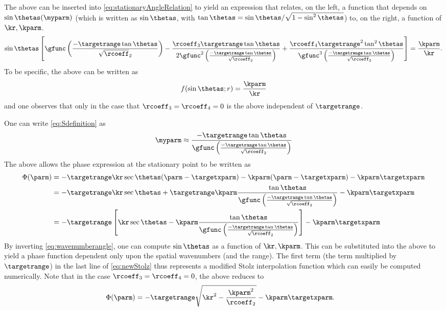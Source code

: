 The above can be inserted into \eqref{eq:stationaryAngleRelation} to yield an expression that relates, on the left, a function that depends on $\sin\thetas(\myparm)$ (which is written as $\sin\thetas$, with $\tan\thetas=\sin\thetas/\sqrt{1-\sin^2\thetas}$) to, on the right, a function of $\kr, \kparm$.
\begin{equation}
 \sin\thetas\left[\gfunc\left(\frac{-\targetrange\tan\thetas}{\sqrt\rcoeff_2}\right) - \frac{\rcoeff_3\targetrange\tan\thetas}{2\gfunc^2\left(\frac{-\targetrange\tan\thetas}{\sqrt\rcoeff_2}\right)} + \frac{\rcoeff_4\targetrange^2\tan^2\thetas}{\gfunc^3\left(\frac{-\targetrange\tan\thetas}{\sqrt\rcoeff_2}\right)}\right] = \frac{\kparm}{\kr}.
 \label{eq:angleRelation}
\end{equation}
To be specific, the above can be written as
\begin{equation}
 f(\sin\thetas; r) = \frac{\kparm}{\kr}
 \label{eq:wavenumberangle}
\end{equation}
and one observes that only in the case that $\rcoeff_3=\rcoeff_4=0$ is the above independent of $\targetrange$.
\par
One can write \eqref{eq:Sdefinition} as
\begin{equation}
 \myparm\approx\frac{-\targetrange\tan\thetas}{\gfunc\left(\frac{-\targetrange\tan\thetas}{\sqrt\rcoeff_2}\right)}
\end{equation}
The above allows the phase expression at the stationary point to be written as
\begin{equation}
\begin{split}
 \Phi(\parm) &= -\targetrange\kr\sec\thetas(\parm-\targetxparm) - \kparm(\parm-\targetxparm) - \kparm\targetxparm\\
 &= -\targetrange\kr\sec\thetas + \targetrange\kparm\frac{\tan\thetas}{\gfunc\left(\frac{-\targetrange\tan\thetas}{\sqrt\rcoeff_2}\right)} - \kparm\targetxparm\\
 &= -\targetrange\left[\kr\sec\thetas - \kparm\frac{\tan\thetas}{\gfunc\left(\frac{-\targetrange\tan\thetas}{\sqrt\rcoeff_2}\right)}\right] - \kparm\targetxparm
 \label{eq:newStolz}
 \end{split}
\end{equation}
By inverting \eqref{eq:wavenumberangle}, one can compute $\sin\thetas$ as a function of $\kr, \kparm$. This can be substituted into the above to yield a phase function dependent only upon the spatial wavenumbers (and the range). The first term (the term multiplied by $\targetrange$) in the last line of \eqref{eq:newStolz} thus represents a modified Stolz interpolation function which can easily be computed numerically. Note that in the case $\rcoeff_3=\rcoeff_4=0$, the above reduces to
\begin{equation}
\begin{split}
 \Phi(\parm) &= -\targetrange\sqrt{\kr^2 - \frac{\kparm^2}{\rcoeff_2}} - \kparm\targetxparm.
 \label{eq:oldStolz}
 \end{split}
\end{equation}
